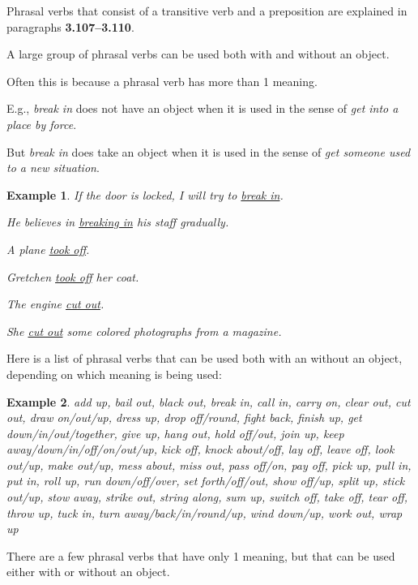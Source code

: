 \documentclass[oneside]{book}
\numberwithin{equation}{section}
\newtheorem{example}{Example}[section]
\begin{document}
Phrasal verbs that consist of a transitive verb and a preposition are explained in paragraphs \textbf{3.107--3.110}.

%
\noindent{} A large group of phrasal verbs can be used both with and without an object.

%
Often this is because a phrasal verb has more than 1 meaning.

E.g., \textit{break in} does not have an object when it is used in the sense of \textit{get into a place by force}.

But \textit{break in} does take an object when it is used in the sense of \textit{get someone used to a new situation}.
\begin{example}
    If the door is locked, I will try to \underline{break in}.
    
    He believes in \underline{breaking in} his staff gradually.
    
    A plane \underline{took off}.
    
    Gretchen \underline{took off} her coat.
    
    The engine \underline{cut out}.
    
    She \underline{cut out} some colored photographs from a magazine.
\end{example}
%
\noindent{} Here is a list of phrasal verbs that can be used both with an without an object, depending on which meaning is being used:
\begin{example}
    add up, bail out, black out, break in, call in, carry on, clear out, cut out, draw on/out/up, dress up, drop off/round, fight back, finish up, get down/in/out/together, give up, hang out, hold off/out, join up, keep away/down/in/off/on/out/up, kick off, knock about/off, lay off, leave off, look out/up, make out/up, mess about, miss out, pass off/on, pay off, pick up, pull in, put in, roll up, run down/off/over, set forth/off/out, show off/up, split up, stick out/up, stow away, strike out, string along, sum up, switch off, take off, tear off, throw up, tuck in, turn away/back/in/round/up, wind down/up, work out, wrap up
\end{example}
%
\noindent{} There are a few phrasal verbs that have only 1 meaning, but that can be used either with or without an object.
\end{document}
